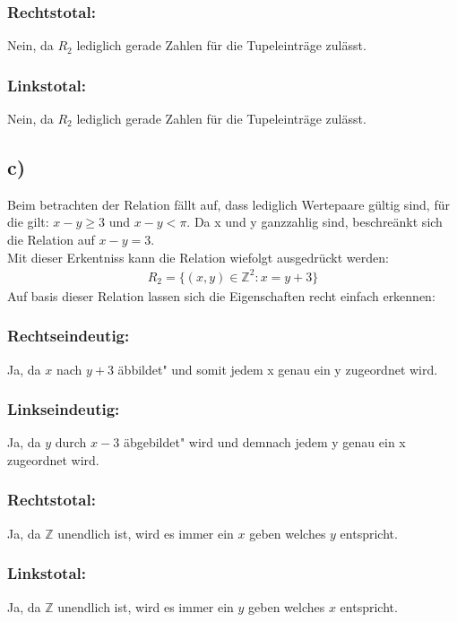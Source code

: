 \documentclass{article}
\begin{document}
\subsubsection*{Rechtstotal: }
Nein, da $R_{2}$ lediglich gerade Zahlen für die Tupeleinträge zulässt.

\subsubsection*{Linkstotal: }
Nein, da $R_{2}$ lediglich gerade Zahlen für die Tupeleinträge zulässt.

\subsection*{c)}
Beim betrachten der Relation fällt auf, dass lediglich Wertepaare gültig sind, für die gilt: $x - y \geq 3$ und $x - y < \pi$. Da x und y ganzzahlig sind, beschreänkt sich die Relation auf $x - y = 3$. \\
Mit dieser Erkentniss kann die Relation wiefolgt ausgedrückt werden: 
\begin{align*}
R_{2} = \{(x, y) \in \mathbb{Z}^2: x = y + 3\}
\end{align*}
Auf basis dieser Relation lassen sich die Eigenschaften recht einfach erkennen:

\subsubsection*{Rechtseindeutig: }
Ja, da $x$ nach $y + 3$ \"abbildet" und somit jedem x genau ein y zugeordnet wird.

\subsubsection*{Linkseindeutig: }
Ja, da $y$ durch $x - 3$ \"abgebildet" wird und demnach jedem y genau ein x zugeordnet wird.

\subsubsection*{Rechtstotal: }
Ja, da $\mathbb{Z}$ unendlich ist, wird es immer ein $x$ geben welches $y$ entspricht.

\subsubsection*{Linkstotal: }
Ja, da $\mathbb{Z}$ unendlich ist, wird es immer ein $y$ geben welches $x$ entspricht.
\end{document}
